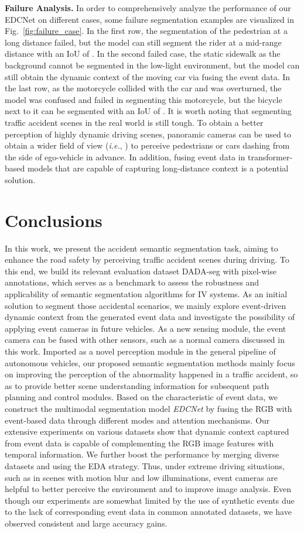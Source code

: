 \documentclass[journal]{IEEEtran}
\begin{document}
\textbf{Failure Analysis.}
In order to comprehensively analyze the performance of our EDCNet on different cases, some failure segmentation examples are visualized in Fig.~\ref{fig:failure_case}. In the first row, the segmentation of the pedestrian at a long distance failed, but the model can still segment the rider at a mid-range distance with an IoU of . In the second failed case, the static sidewalk as the background cannot be segmented in the low-light environment, but the model can still obtain the dynamic context of the moving car via fusing the event data. In the last row, as the motorcycle collided with the car and was overturned, the model was confused and failed in segmenting this motorcycle, but the bicycle next to it can be segmented with an IoU of . It is worth noting that segmenting traffic accident scenes in the real world is still tough. To obtain a better perception of highly dynamic driving scenes, panoramic cameras can be used to obtain a wider field of view (\textit{i.e.}, ) to perceive pedestrians or cars dashing from the side of ego-vehicle in advance. In addition, fusing event data in transformer-based models that are capable of capturing long-distance context is a potential solution.

\section{Conclusions}
In this work, we present the accident semantic segmentation task, aiming to enhance the road safety by perceiving traffic accident scenes during driving.
To this end, we build its relevant evaluation dataset DADA-seg with pixel-wise annotations, which serves as a benchmark to assess the robustness and applicability of semantic segmentation algorithms for IV systems.
As an initial solution to segment those accidental scenarios, we mainly explore event-driven dynamic context from the generated event data and investigate the possibility of applying event cameras in future vehicles. As a new sensing module, the event camera can be fused with other sensors, such as a normal camera discussed in this work. Imported as a novel perception module in the general pipeline of autonomous vehicles, our proposed semantic segmentation methods mainly focus on improving the perception of the abnormality happened in a traffic accident, so as to provide better scene understanding information for subsequent path planning and control modules.
Based on the characteristic of event data, we construct the multimodal segmentation model \emph{EDCNet} by fusing the RGB with event-based data through different modes and attention mechanisms. Our extensive experiments on various datasets show that dynamic context captured from event data is capable of complementing the RGB image features with temporal information. We further boost the performance by merging diverse datasets and using the EDA strategy. Thus, under extreme driving situations, such as in scenes with motion blur and low illuminations, event cameras are helpful to better perceive the environment and to improve image analysis. Even though our experiments are somewhat limited by the use of synthetic events due to the lack of corresponding event data in common annotated datasets, we have observed consistent and large accuracy gains.
\end{document}
